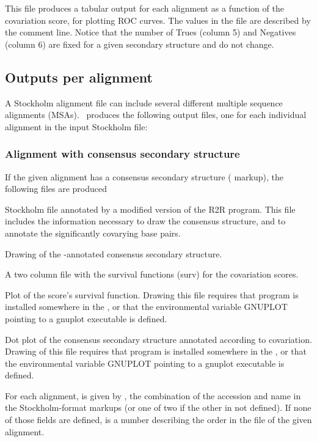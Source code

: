 This file produces a tabular output for each alignment as a function
of the covariation score, for plotting ROC curves. The values in the
file are described by the comment line. Notice that the number of
Trues (column 5) and Negatives (column 6) are fixed for a given
secondary structure and do not change.

\subsection{Outputs per alignment}

A Stockholm alignment file can include several different multiple
sequence alignments (MSAs).  \rscape\ produces the following output
files, one for each individual alignment in the input Stockholm file:

\subsubsection{Alignment with consensus secondary structure}
If the given alignment  has a consensus secondary structure
( markup), the following files are produced

\begin{sreitems}{}
\item[\emprog{rnafile\_msaname.R2R.sto}] Stockholm file annotated by a
  modified version of the R2R program. This file includes the
  information necessary to draw the consensus structure, and to
  annotate the significantly covarying base pairs.
%
\item[\emprog{rnafile\_msaname.R2R.sto.\{pdf,svg\}}] Drawing of the
  \rscape-annotated consensus secondary structure.
%
\item[\emprog{rnafile\_msaname.surv}] A two column file with the 
survival functions (surv) for the covariation scores.
%
\item[\emprog{rnafile\_msaname.surv.ps}] Plot of the score's survival function. Drawing this
file requires that program  is installed somewhere in the
, or that the environmental variable GNUPLOT 
pointing to a gnuplot executable is defined.
%
\item[\emprog{rnafile\_msaname.dplot.\{ps,svg\}}] Dot plot of the consensus
  secondary structure annotated according to covariation. Drawing of this
file requires that program  is installed somewhere in the
, or that the environmental variable GNUPLOT 
pointing to a gnuplot executable is defined.
%
\end{sreitems}
For each alignment,  is given
by , the combination of the accession  and name  in the Stockholm-format markups (or
one of two if the other in not defined).  If none of those fields are
defined,  is a number describing the order in the
file of the given alignment.

